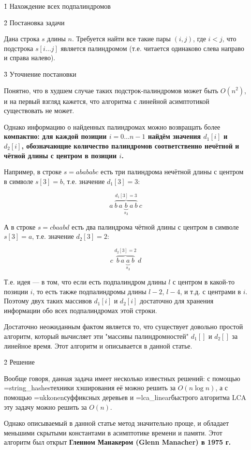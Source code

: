 \h1{ Нахождение всех подпалиндромов }


\h2{ Постановка задачи }

Дана строка $s$ длины $n$. Требуется найти все такие пары $(i,j)$, где $i<j$, что подстрока $s[i \ldots j]$ является палиндромом (т.е. читается одинаково слева направо и справа налево).


\h3{ Уточнение постановки }

Понятно, что в худшем случае таких подстрок-палиндромов может быть $O(n^2)$, и на первый взгляд кажется, что алгоритма с линейной асимптотикой существовать не может.

Однако информацию о найденных палиндромах можно возвращать более \bf{компактно}: для каждой позиции $i=0 \ldots n-1$ найдём значения $d_1[i]$ и $d_2[i]$, обозначающие количество палиндромов соответственно нечётной и чётной длины с центром в позиции $i$.

Например, в строке $s = abababc$ есть три палиндрома нечётной длины с центром в символе $s[3]=b$, т.е. значение $d_1[3]=3$:

$$ a\ \overbrace{b\ a\ \underbrace{b}_{s_3}\ a\ b}^{d_1[3]=3}\ c $$

А в строке $s = cbaabd$ есть два палиндрома чётной длины с центром в символе $s[3]=a$, т.е. значение $d_2[3]=2$:

$$ c\ \overbrace{b\ a\ \underbrace{a}_{s_3}\ b}^{d_2[3]=2}\ d $$

Т.е. идея --- в том, что если есть подпалиндром длины $l$ с центром в какой-то позиции $i$, то есть также подпалиндромы длины $l-2$, $l-4$, и т.д. с центрами в $i$. Поэтому двух таких массивов $d_1[i]$ и $d_2[i]$ достаточно для хранения информации обо всех подпалиндромах этой строки.

Достаточно неожиданным фактом является то, что существует довольно простой алгоритм, который вычисляет эти "массивы палиндромностей" $d_1[]$ и $d_2[]$ за линейное время. Этот алгоритм и описывается в данной статье.


\h2{ Решение }

Вообще говоря, данная задача имеет несколько известных решений: с помощью \algohref=string_hashes{техники хэширования} её можно решить за $O (n \log n)$, а с помощью \algohref=ukkonen{суффиксных деревьев} и \algohref=lca_linear{быстрого алгоритма LCA} эту задачу можно решить за $O (n)$.

Однако описываемый в данной статье метод значительно проще, и обладает меньшими скрытыми константами в асимптотике времени и памяти. Этот алгоритм был открыт \bf{Гленном Манакером (Glenn Manacher)} в 1975 г.


